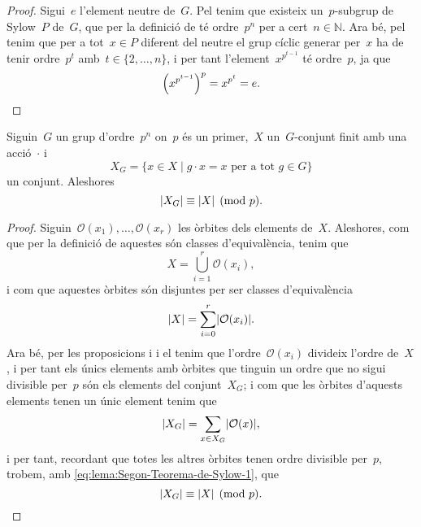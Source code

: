 \documentclass[../estructures-algebraiques.tex]{subfiles}
\begin{document}
    \begin{proof}
        Sigui~\(e\) l'element neutre de~\(G\).
        Pel  tenim que existeix un~\(p\)-subgrup de Sylow~\(P\) de~\(G\), que per la definició de  té ordre~\(p^{n}\) per a cert~\(n\in\mathbb{N}\).
        Ara bé, pel  tenim que per a tot~\(x\in P\) diferent del neutre el grup cíclic generar per~\(x\) ha de tenir ordre~\(p^{t}\) amb~\(t\in\{2,\dots,n\}\), i per tant l'element~\(x^{p^{t-1}}\) té ordre~\(p\), ja que
        \[
            \left(x^{p^{t-1}}\right)^{p}=x^{p^{t}}=e.\qedhere
        \]
    \end{proof}
    \begin{lemma}
        \label{lema:Segon-Teorema-de-Sylow}
        Siguin~\(G\) un grup d'ordre~\(p^{n}\) on~\(p\) és un primer,~\(X\) un~\(G\)-conjunt finit amb una acció~\(\cdot\) i
        \[
            X_{G}=\{x\in X\mid g\cdot x=x\text{ per a tot }g\in G\}
        \]
        un conjunt.
        Aleshores
        \[
            \abs{X_{G}}\equiv\abs{X}\pmod{p}.
        \]
    \end{lemma}
    \begin{proof}
        Siguin~\(\mathcal{O}(x_{1}),\dots,\mathcal{O}(x_{r})\) les òrbites dels elements de~\(X\).
        Aleshores, com que per la definició de  aquestes són classes d'equivalència, tenim que %
        \[
            X=\bigcup_{i=1}^{r}\mathcal{O}(x_{i}),
        \]
        i com que aquestes òrbites són disjuntes per ser classes d'equivalència
        \begin{equation}
    \label{eq:lema:Segon-Teorema-de-Sylow-1}
        \abs{X}=\sum_{i=0}^{r}\abs{\mathcal{O}(x_{i})}.
        \end{equation}
        Ara bé, per les proposicions  i  i el  tenim que l'ordre~\(\mathcal{O}(x_{i})\) divideix l'ordre de~\(X\), i per tant els únics elements amb òrbites que tinguin un ordre que no sigui divisible per~\(p\) són els elements del conjunt~\(X_{G}\); i com que les òrbites d'aquests elements tenen un únic element tenim que
        \[
            \abs{X_{G}}=\sum_{x\in X_{G}}\abs{\mathcal{O}(x)},
        \]
        i per tant, recordant que totes les altres òrbites tenen ordre divisible per~\(p\), trobem, amb \eqref{eq:lema:Segon-Teorema-de-Sylow-1}, que
        \[
            \abs{X_{G}}\equiv\abs{X}\pmod{p}.\qedhere
        \]
    \end{proof}
\end{document}
